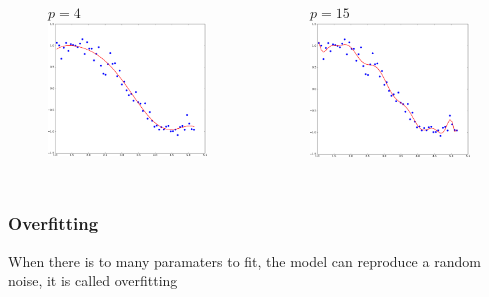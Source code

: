 \documentclass[handout, 10pt]{beamer}
\begin{document}
\begin{frame}
\begin{columns}
\begin{figure}
$p=4$
\includegraphics[width=0.99\textwidth]{./linreg_pow4.png}
\end{figure}
\vspace{-2em}
\begin{figure}
$p=15$
\includegraphics[width=0.99\textwidth]{./linreg_pow15.png}
\end{figure}
\end{columns}
\end{frame}


\begin{frame}
\frametitle{Overfitting}
\begin{block}{}
When there is to many paramaters to fit, the model can reproduce 
a random noise, it is called \alert{overfitting}
\end{block}
\pause
\begin{table}
\resizebox{\textwidth}{!}{%
}
\end{table}
\end{frame}
\end{document}
